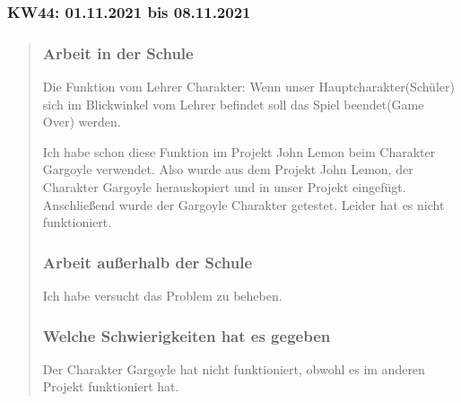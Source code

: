
\subsubsection{KW44: 01.11.2021 bis 08.11.2021}
\begin{quote}
	\subsubsection*{Arbeit in der Schule}
	Die Funktion vom Lehrer Charakter: Wenn unser Hauptcharakter(Schüler) sich im Blickwinkel vom Lehrer befindet soll das Spiel beendet(Game Over) werden.
	
	 Ich habe schon diese Funktion im Projekt John Lemon beim Charakter Gargoyle verwendet. Also wurde aus dem Projekt John Lemon, der Charakter Gargoyle herauskopiert und in unser Projekt eingefügt. Anschließend wurde der Gargoyle Charakter getestet. Leider hat es nicht funktioniert.
	 
	 \subsubsection*{Arbeit außerhalb der Schule}
	Ich habe versucht das Problem zu beheben.
	
	\subsubsection*{Welche Schwierigkeiten hat es gegeben}
	Der Charakter Gargoyle hat nicht funktioniert, obwohl es im anderen Projekt funktioniert hat.
\end{quote}

